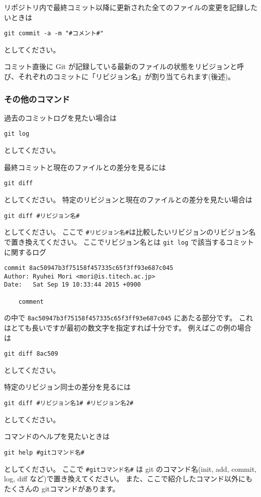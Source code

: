 \documentclass[a4paper]{article}
\begin{document}
リポジトリ内で最終コミット以降に更新された全てのファイルの変更を記録したいときは
\begin{verbatim}
git commit -a -m "#コメント#"
\end{verbatim}
としてください。

コミット直後に Git が記録している最新のファイルの状態をリビジョンと呼び、それぞれのコミットに「リビジョン名」が割り当てられます(後述)。


\subsubsection{その他のコマンド}
過去のコミットログを見たい場合は
\begin{verbatim}
git log
\end{verbatim}
としてください。

最終コミットと現在のファイルとの差分を見るには
\begin{verbatim}
git diff
\end{verbatim}
としてください。
特定のリビジョンと現在のファイルとの差分を見たい場合は
\begin{verbatim}
git diff #リビジョン名#
\end{verbatim}
としてください。
ここで \texttt{\#リビジョン名\#}は比較したいリビジョンのリビジョン名で置き換えてください。
ここでリビジョン名とは \texttt{git log} で該当するコミットに関するログ
\begin{verbatim}
commit 8ac50947b3f75158f457335c65f3ff93e687c045
Author: Ryuhei Mori <mori@is.titech.ac.jp>
Date:   Sat Sep 19 10:33:44 2015 +0900

    comment
\end{verbatim}
の中で \texttt{8ac50947b3f75158f457335c65f3ff93e687c045} にあたる部分です。
これはとても長いですが最初の数文字を指定すれば十分です。
例えばこの例の場合は
\begin{verbatim}
git diff 8ac509
\end{verbatim}
としてください。

特定のリビジョン同士の差分を見るには
\begin{verbatim}
git diff #リビジョン名1# #リビジョン名2#
\end{verbatim}
としてください。

コマンドのヘルプを見たいときは
\begin{verbatim}
git help #gitコマンド名#
\end{verbatim}
としてください。
ここで \texttt{\#gitコマンド名\#} は git のコマンド名(init, add, commit, log, diff など)で置き換えてください。
また、ここで紹介したコマンド以外にもたくさんの gitコマンドがあります。
\end{document}
